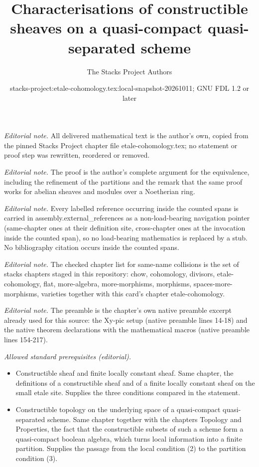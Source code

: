 \documentclass[10pt,a4paper]{amsart}
\title{Characterisations of constructible sheaves on a quasi-compact quasi-separated scheme}
\author{The Stacks Project Authors}
\date{stacks-project:etale-cohomology.tex:local-snapshot-20261011; GNU FDL 1.2 or later}
\theoremstyle{plain}
\theoremstyle{definition}
\theoremstyle{remark}
\numberwithin{equation}{subsection}
\begin{document}
\maketitle
\noindent\textit{Editorial note.} All delivered mathematical text is the author's own, copied from the pinned Stacks Project chapter file etale-cohomology.tex; no statement or proof step was rewritten, reordered or removed.\par\medskip
\noindent\textit{Editorial note.} The proof is the author's complete argument for the equivalence, including the refinement of the partitions and the remark that the same proof works for abelian sheaves and modules over a Noetherian ring.\par\medskip
\noindent\textit{Editorial note.} Every labelled reference occurring inside the counted spans is carried in assembly.external\_references as a non-load-bearing navigation pointer (same-chapter ones at their definition site, cross-chapter ones at the invocation inside the counted span), so no load-bearing mathematics is replaced by a stub. No bibliography citation occurs inside the counted spans.\par\medskip
\noindent\textit{Editorial note.} The checked chapter list for same-name collisions is the set of stacks chapters staged in this repository: chow, cohomology, divisors, etale-cohomology, flat, more-algebra, more-morphisms, morphisms, spaces-more-morphisms, varieties together with this card's chapter etale-cohomology.\par\medskip
\noindent\textit{Editorial note.} The preamble is the chapter's own native preamble excerpt already used for this source: the Xy-pic setup (native preamble lines 14-18) and the native theorem declarations with the mathematical macros (native preamble lines 154-217).\par\medskip
\noindent\textit{Allowed standard prerequisites (editorial).}\begin{itemize}
\item Constructible sheaf and finite locally constant sheaf. Same chapter, the definitions of a constructible sheaf and of a finite locally constant sheaf on the small etale site. Supplies the three conditions compared in the statement.
\item Constructible topology on the underlying space of a quasi-compact quasi-separated scheme. Same chapter together with the chapters Topology and Properties, the fact that the constructible subsets of such a scheme form a quasi-compact boolean algebra, which turns local information into a finite partition. Supplies the passage from the local condition (2) to the partition condition (3).
\end{itemize}\medskip
\end{document}
